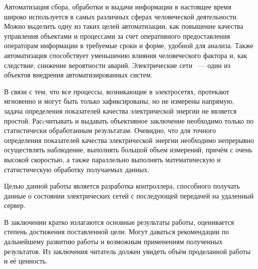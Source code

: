 \documentclass[utf8x,14pt, coursreport]{G7-32}
\begin{document}
\Introduction
Автоматизация сбора, обработки и выдачи информации в настоящее время широко используется в самых различных сферах человеческой деятельности. Можно выделить одну из таких целей автоматизации, как повышение качества управления объектами и процессами за счет оперативного предоставления операторам информации в требуемые сроки и форме, удобной для анализа. Также автоматизация способствует уменьшению влияния человеческого фактора и, как следствие, снижение вероятности аварий. Электрические сети ~--- один из объектов внедрения автоматизированных систем.

В связи с тем, что все процессы, возникающие в электросетях, протекают мгновенно и могут быть только зафиксированы, но не измерены напрямую, задача определения показателей качества электрической энергии не является простой. Расcчитывать и выдавать объективное заключение необходимо только по статистически обработанным результатам. Очевидно, что для точного определения показателей качества электрической энергии необходимо непрерывно осуществлять наблюдение, выполнять большой объем измерений, причём с очень высокой скоростью, а также параллельно выполнять математическую и статистическую обработку получаемых данных.\cite{qualitymonitor}

Целью данной работы является разработка контроллера, способного получать данные о состоянии электрических сетей с последующей передачей на удаленный сервер.


\mainmatter %



\iffalse
\fi






\backmatter %

\Conclusion

В заключении кратко излагаются основные результаты работы, оценивается степень достижения поставленной цели. Могут даваться рекомендации по дальнейшему развитию работы и возможным применениям полученных результатов. Из заключения читатель должен увидеть объём проделанной работы и её ценность.
\end{document}
